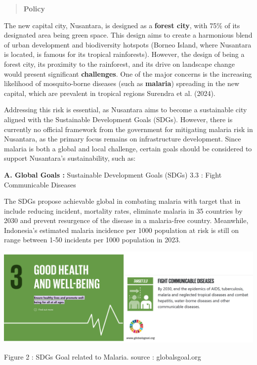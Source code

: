 \documentclass[
  letterpaper,
  DIV=11,
  numbers=noendperiod]{scrreprt}
\begin{document}
\begin{quote}
\textbf{Policy}
\end{quote}

The new capital city, Nusantara, is designed as a \textbf{forest city},
with 75\% of its designated area being green space. This design aims to
create a harmonious blend of urban development and biodiversity hotspots
(Borneo Island, where Nusantara is located, is famous for its tropical
rainforests). However, the design of being a forest city, its proximity
to the rainforest, and its drive on landscape change would present
significant \textbf{challenges}. One of the major concerns is the
increasing likelihood of mosquito-borne diseases (such as
\textbf{malaria}) spreading in the new capital, which are prevalent in
tropical regions Surendra et al. (2024).

Addressing this risk is essential, as Nusantara aims to become a
sustainable city aligned with the Sustainable Development Goals (SDGs).
However, there is currently no official framework from the government
for mitigating malaria risk in Nusantara, as the primary focus remains
on infrastructure development. Since malaria is both a global and local
challenge, certain goals should be considered to support Nusantara's
sustainability, such as:

\textbf{A. Global Goals :} Sustainable Development Goals (SDGs) 3.3 :
Fight Communicable Diseases

The SDGs propose achievable global in combating malaria with target that
in include reducing incident, mortality rates, eliminate malaria in 35
countries by 2030 and prevent resurgence of the disease in a
malaria-free country. Meanwhile, Indonesia's estimated malaria incidence
per 1000 population at risk is still on range between 1-50 incidents per
1000 population in 2023.

\includegraphics{images/clipboard-3146823061.png}

Figure 2 : SDGs Goal related to Malaria. source : globalsgoal.org
\end{document}

